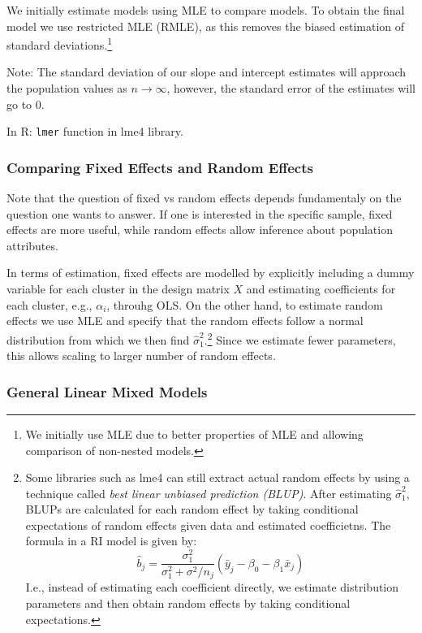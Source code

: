 \documentclass[11pt, %
	oneside, %
	english, %
	onehalfspacing, %
	]{article} %
\numberwithin{equation}{section}
\begin{document}
We initially estimate models using MLE to compare models. To obtain the final model we use restricted MLE (RMLE), as this removes the biased estimation of standard deviations.\footnote{We initially use MLE due to better properties of MLE and allowing comparison of non-nested models.}

Note: The standard deviation of our slope and intercept estimates will approach the population values as $n \to \infty$, however, the standard error of the estimates will go to $0$.


In R: \lstinline|lmer| function in lme4 library.

\subsubsection*{Comparing Fixed Effects and Random Effects}

Note that the question of fixed vs random effects depends fundamentaly on the question one wants to answer. If one is interested in the specific sample, fixed effects are more useful, while random effects allow inference about population attributes.

In terms of estimation, fixed effects are modelled by explicitly including a dummy variable for each cluster in the design matrix $X$ and estimating coefficients for each cluster, e.g., $\alpha_i$, throuhg OLS. On the other hand, to estimate random effects we use MLE and specify that the random effects follow a normal distribution from which we then find $\hat{\sigma}^2_1$.\footnote{Some libraries such as lme4 can still extract actual random effects by using a technique called \emph{best linear unbiased prediction (BLUP)}. After estimating $\hat{\sigma}^2_1$, BLUPs are calculated for each random effect by taking conditional expectations of random effects given data and estimated coefficietns. The formula in a RI model is given by:
\begin{equation*}
    \hat{b}_j=\frac{\sigma_1^2}{\sigma_1^2+\sigma^2 / n_j}\left(\bar{y}_j-\beta_0-\beta_1 \bar{x}_j\right)
\end{equation*}
I.e., instead of estimating each coefficient directly, we estimate distribution parameters and then obtain random effects by taking conditional expectations.
}
Since we estimate fewer parameters, this allows scaling to larger number of random effects.


\subsubsection*{General Linear Mixed Models}
\end{document}
